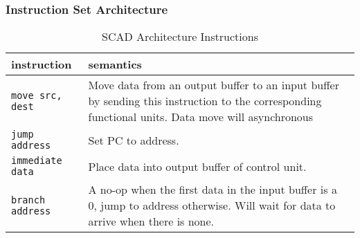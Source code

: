 \begin{frame}[shrink=20,fragile]
	\frametitle{Instruction Set Architecture}
	
	\begin{table}
		\begin{tabular}{| l | p{8cm} |}
			\hline
			\textbf{instruction} & \textbf{semantics} \\ \hline
			\lstinline{move src, dest} & Move data from an output buffer to an input buffer by sending this instruction to the corresponding functional units. Data move will asynchronous \\ \hline
			\lstinline{jump address} & Set PC to address. \\ \hline
			\lstinline{immediate data} & Place data into output buffer of control unit. \\ \hline
			\lstinline{branch address} & A no-op when the first data in the input buffer is a 0, jump to address otherwise. Will wait for data to arrive when there is none. \\ \hline
		\end{tabular}
		\label{fig:instruction_table}
		\caption{SCAD Architecture Instructions}
	\end{table}
\end{frame}
